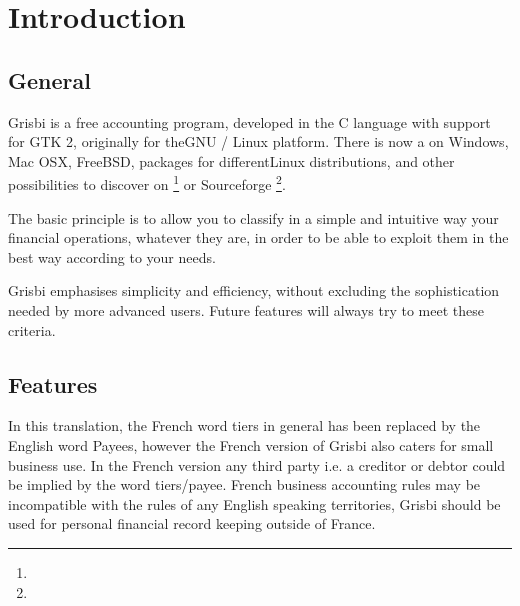 







\chapter{Introduction\label{introduction}}

\section{General \label{introduction-General}}

Grisbi is a free accounting program, developed in the \gls{C language} with support for \gls{GTK} 2, originally for the\gls{GNU / Linux} platform. There is now a   on Windows, Mac OSX, FreeBSD, packages for different\gls{Linux distributions}, and other possibilities to discover on \footnote{ \urlGrisbi{}} or Sourceforge \footnote{ \urlSourceForge{}}.

The basic principle is to allow you to classify in a simple and intuitive way your financial operations, whatever they are, in order to be able to exploit them in the best way according to your needs.

Grisbi emphasises simplicity and efficiency, without excluding the sophistication needed by more advanced users. Future features will always try to meet these criteria.

\section{Features \label{introduction-features}}

 In this translation, the French word tiers in general has been replaced by the English word Payees, however the French version of Grisbi also caters for small business use. In the French version any third party i.e. a creditor or debtor could be implied by the word tiers/payee.  French business accounting rules may be incompatible with the rules of any English speaking territories, Grisbi should be used  for personal financial record keeping outside of France.



